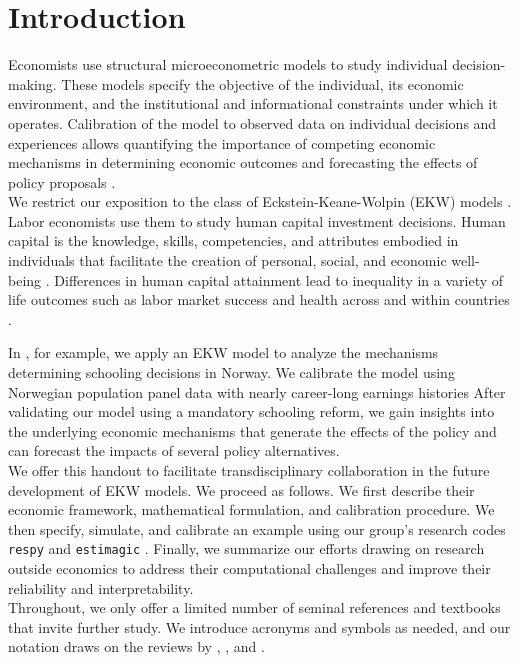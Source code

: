 \section{Introduction}
\noindent Economists use structural microeconometric models to study individual decision-making. These models specify the objective of the individual, its economic environment, and the institutional and informational constraints under which it operates. Calibration of the model to observed data on individual decisions and experiences allows quantifying the importance of competing economic mechanisms in determining economic outcomes and forecasting the effects of policy proposals \citep{Wolpin.2013}.\\

\noindent We restrict our exposition to the class of Eckstein-Keane-Wolpin (EKW) models \citep{Adda.2017, Blundell.2016, Keane.1997}. Labor economists use them to study human capital investment decisions. Human capital is the knowledge, skills, competencies, and attributes embodied in individuals that facilitate the creation of personal, social, and economic well-being \citep{Becker.1964}. Differences in human capital attainment lead to inequality in a variety of life outcomes such as labor market success and health across and within countries \citep{OECD.2001}.

In \citet{Bhuller.2018}, for example, we apply an EKW model to analyze the mechanisms determining schooling decisions in Norway. We calibrate the model using Norwegian population panel data with nearly career-long earnings histories  After validating our model using a mandatory schooling reform, we gain insights into the underlying economic mechanisms that generate the effects of the policy and can forecast the impacts of several policy alternatives.\\

\noindent We offer this handout to facilitate transdisciplinary collaboration in the future development of EKW models. We proceed as follows. We first describe their economic framework, mathematical formulation, and calibration procedure. We then specify, simulate, and calibrate an example using our group's research codes \verb+respy+ \citep{respy-1.0} and \verb+estimagic+ \citep{Gabler.2019}. Finally, we summarize our efforts drawing on research outside economics to address their computational challenges and improve their reliability and interpretability.\\

\noindent Throughout, we only offer a limited number of seminal references and textbooks that invite further study. We introduce acronyms and symbols as needed, and our notation draws on the reviews by \cite{Aguirregabiria.2010}, \cite{Arcidiacono.2011}, and \cite{Puterman.1994}.
